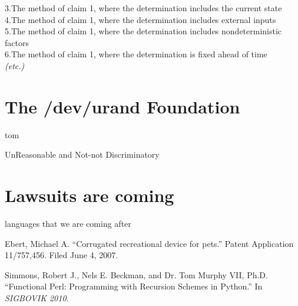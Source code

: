 \documentclass[acmtocl]%
{boviktrans}
\begin{document}
3.\quad The method of claim 1, where the determination includes the current state \\

4.\quad The method of claim 1, where the determination includes external inputs \\

5.\quad The method of claim 1, where the determination includes nondeterministic factors \\

6.\quad The method of claim 1, where the determination is fixed ahead of time \\

{\it (etc.)}

\section{The /dev/urand Foundation}

tom

UnReasonable and Not-not Discriminatory

\section{Lawsuits are coming}

languages that we are coming after


\begin{thebibliography}{1}


Ebert, Michael A.
\newblock ``Corrugated recreational device for pets.''
\newblock Patent Application 11/757,456.
\newblock Filed June 4, 2007.

Simmons, Robert J., Nels E. Beckman, and Dr. Tom Murphy VII, Ph.D.
\newblock ``Functional Perl: Programming with Recursion Schemes in Python.''
\newblock In {\it SIGBOVIK 2010}.

\end{thebibliography}
\end{document}
